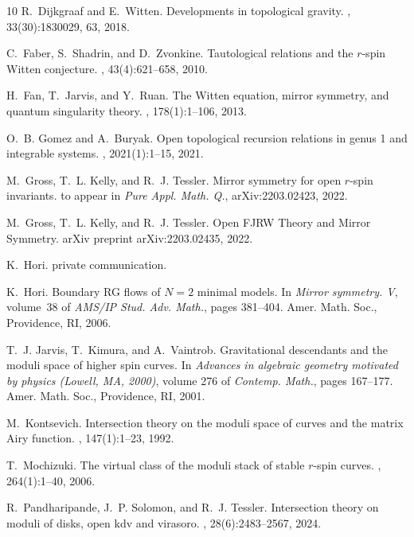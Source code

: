 \documentclass[11pt]{amsart}
\theoremstyle{definition}
\theoremstyle{remark}
\newcommand{\<}{\left<}
\renewcommand{\>}{\right>}
\numberwithin{equation}{section}
\begin{document}
\begin{thebibliography}{10}
R.~Dijkgraaf and E.~Witten.
\newblock Developments in topological gravity.
, 33(30):1830029, 63, 2018.

C.~Faber, S.~Shadrin, and D.~Zvonkine.
\newblock Tautological relations and the {$r$}-spin {W}itten conjecture.
, 43(4):621--658, 2010.

H.~Fan, T.~Jarvis, and Y.~Ruan.
\newblock The {W}itten equation, mirror symmetry, and quantum singularity
  theory.
, 178(1):1--106, 2013.

O.~B. Gomez and A.~Buryak.
\newblock Open topological recursion relations in genus 1 and integrable
  systems.
, 2021(1):1--15, 2021.

M.~Gross, T.~L. Kelly, and R.~J. Tessler.
\newblock Mirror symmetry for open $r$-spin invariants.
\newblock to appear in \textit{Pure Appl. Math. Q.}, arXiv:2203.02423, 2022.

M.~Gross, T.~L. Kelly, and R.~J. Tessler.
\newblock Open {FJRW} {T}heory and {M}irror {S}ymmetry.
\newblock arXiv preprint arXiv:2203.02435, 2022.

K.~Hori.
\newblock private communication.

K.~Hori.
\newblock Boundary {RG} flows of {$N=2$} minimal models.
\newblock In {\em Mirror symmetry. {V}}, volume~38 of {\em AMS/IP Stud. Adv.
  Math.}, pages 381--404. Amer. Math. Soc., Providence, RI, 2006.

T.~J. Jarvis, T.~Kimura, and A.~Vaintrob.
\newblock Gravitational descendants and the moduli space of higher spin curves.
\newblock In {\em Advances in algebraic geometry motivated by physics
  ({L}owell, {MA}, 2000)}, volume 276 of {\em Contemp. Math.}, pages 167--177.
  Amer. Math. Soc., Providence, RI, 2001.

M.~Kontsevich.
\newblock Intersection theory on the moduli space of curves and the matrix
  {A}iry function.
, 147(1):1--23, 1992.

T.~Mochizuki.
\newblock The virtual class of the moduli stack of stable {$r$}-spin curves.
, 264(1):1--40, 2006.

R.~Pandharipande, J.~P. Solomon, and R.~J. Tessler.
\newblock Intersection theory on moduli of disks, open kdv and virasoro.
, 28(6):2483--2567, 2024.


\end{thebibliography}
\end{document}
